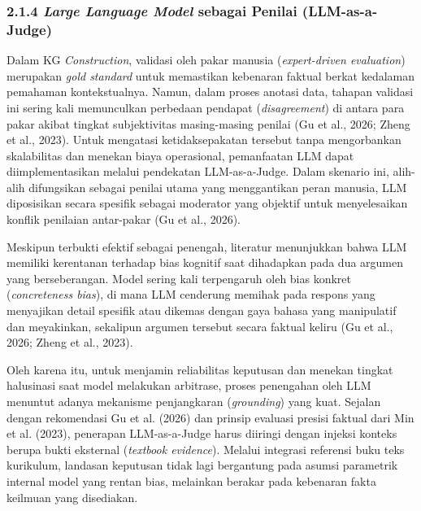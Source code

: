 \documentclass[
]{article}
\begin{document}
\hypertarget{large-language-model-sebagai-penilai-llm-as-a-judge}{%
\subsubsection{\texorpdfstring{2.1.4 \emph{Large Language Model} sebagai
Penilai (LLM-as-a-Judge)
}{2.1.4 Large Language Model sebagai Penilai (LLM-as-a-Judge) }}\label{large-language-model-sebagai-penilai-llm-as-a-judge}}

Dalam KG \emph{Construction}, validasi oleh pakar manusia
(\emph{expert-driven evaluation}) merupakan \emph{gold standard} untuk
memastikan kebenaran faktual berkat kedalaman pemahaman kontekstualnya.
Namun, dalam proses anotasi data, tahapan validasi ini sering kali
memunculkan perbedaan pendapat (\emph{disagreement}) di antara para
pakar akibat tingkat subjektivitas masing-masing penilai (Gu et al.,
2026; Zheng et al., 2023). Untuk mengatasi ketidaksepakatan tersebut
tanpa mengorbankan skalabilitas dan menekan biaya operasional,
pemanfaatan LLM dapat diimplementasikan melalui pendekatan
LLM-as-a-Judge. Dalam skenario ini, alih-alih difungsikan sebagai
penilai utama yang menggantikan peran manusia, LLM diposisikan secara
spesifik sebagai moderator yang objektif untuk menyelesaikan konflik
penilaian antar-pakar (Gu et al., 2026).

Meskipun terbukti efektif sebagai penengah, literatur menunjukkan bahwa
LLM memiliki kerentanan terhadap bias kognitif saat dihadapkan pada dua
argumen yang berseberangan. Model sering kali terpengaruh oleh bias
konkret (\emph{concreteness bias}), di mana LLM cenderung memihak pada
respons yang menyajikan detail spesifik atau dikemas dengan gaya bahasa
yang manipulatif dan meyakinkan, sekalipun argumen tersebut secara
faktual keliru (Gu et al., 2026; Zheng et al., 2023).

Oleh karena itu, untuk menjamin reliabilitas keputusan dan menekan
tingkat halusinasi saat model melakukan arbitrase, proses penengahan
oleh LLM menuntut adanya mekanisme penjangkaran (\emph{grounding}) yang
kuat. Sejalan dengan rekomendasi Gu et al. (2026) dan prinsip evaluasi
presisi faktual dari Min et al. (2023), penerapan LLM-as-a-Judge harus
diiringi dengan injeksi konteks berupa bukti eksternal (\emph{textbook
evidence}). Melalui integrasi referensi buku teks kurikulum, landasan
keputusan tidak lagi bergantung pada asumsi parametrik internal model
yang rentan bias, melainkan berakar pada kebenaran fakta keilmuan yang
disediakan.

\hypertarget{section-2}{%
\subsection{}\label{section-2}}
\end{document}
